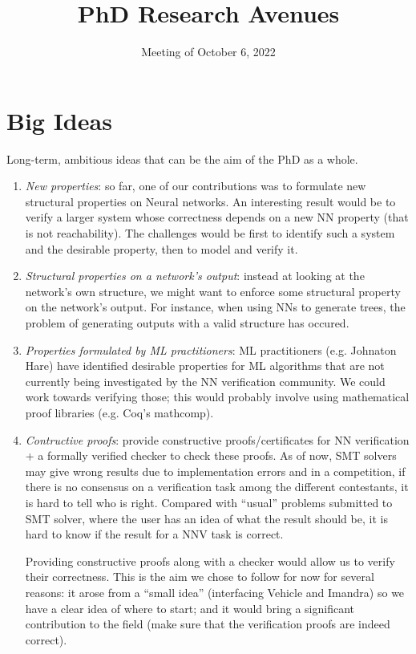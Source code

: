 \documentclass[]{article}
\title{PhD Research Avenues}
\date{Meeting of October 6, 2022}
\begin{document}
\maketitle

\section{Big Ideas}

Long-term, ambitious ideas that can be the aim of the PhD as a whole.

\begin{enumerate}
	\item \emph{New properties}: so far, one of our contributions was to formulate new structural properties on Neural networks. An interesting result would be to verify a larger system whose correctness depends on a new NN property (that is not reachability). The challenges would be first to identify such a system and the desirable property, then to model and verify it.
	
	\item \emph{Structural properties on a network's output}: instead at looking at the network's own structure, we might want to enforce some structural property on the network's output. For instance, when using NNs to generate trees, the problem of generating outputs with a valid structure has occured.
	
	\item \emph{Properties formulated by ML practitioners}: ML practitioners (e.g. Johnaton Hare) have identified desirable properties for ML algorithms that are not currently being investigated by the NN verification community. We could work towards verifying those; this would probably involve using mathematical proof libraries (e.g. Coq's mathcomp).
	
	\item \emph{Contructive proofs}: provide constructive proofs/certificates for NN verification + a formally verified checker to check these proofs. As of now, SMT solvers may give wrong results due to implementation errors and in a competition, if there is no consensus on a verification task among the different contestants, it is hard to tell who is right. Compared with ``usual'' problems submitted to SMT solver, where the user has an idea of what the result should be, it is hard to know if the result for a NNV task is correct.

    Providing constructive proofs along with a checker would allow us to verify their correctness. This is the aim we chose to follow for now for several reasons: it arose from a ``small idea'' (interfacing Vehicle and Imandra) so we have a clear idea of where to start; and it would bring a significant contribution to the field (make sure that the verification proofs are indeed correct).

\end{enumerate}
\end{document}
